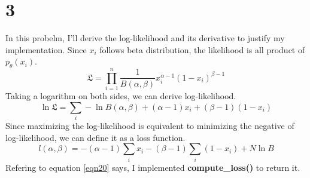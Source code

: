 \documentclass[10pt]{article}
\begin{document}
\section*{3}
In this probelm, I'll derive the log-likelihood and its derivative to justify my implementation.
Since $x_i$ follows beta distribution, the likelihood is all product of $p_\theta(x_i)$.
\begin{equation}
    \mathfrak{L} = \prod_{i = 1}^n \frac{1}{B(\alpha,\beta)} x_i^{\alpha-1}(1-x_i)^{\beta-1}
\end{equation}
Taking a logarithm on both sides, we can derive log-likelihood.
\begin{equation}
    \ln \mathfrak{L} = \sum_i -\ln B(\alpha, \beta) + (\alpha-1)x_i + (\beta-1)(1-x_i)
\end{equation}
Since maximizing the log-likelihood is equivalent to minimizing the negative of log-likelihood, we can define it as a loss function.
\begin{equation}
    l(\alpha, \beta) = -(\alpha-1)\sum_i x_i - (\beta - 1) \sum_i(1-x_i) + N\ln B
    \label{eqn20}
\end{equation}
Refering to equation \ref{eqn20} says, I implemented \textbf{compute\_loss()} to return it. 
\end{document}
